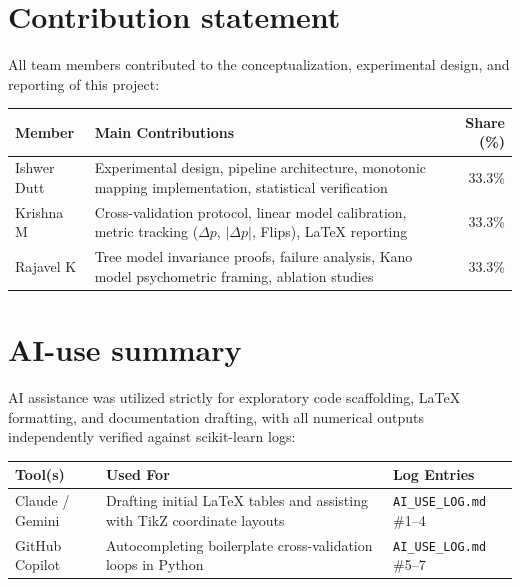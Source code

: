 \documentclass[10pt,a4paper]{article}
\begin{document}
\section*{Contribution statement}
All team members contributed to the conceptualization, experimental design, and reporting of this project:
\begin{center}
\begin{tabularx}{\linewidth}{@{}lXr@{}}
\toprule
\textbf{Member} & \textbf{Main Contributions} & \textbf{Share (\%)} \\
\midrule
Ishwer Dutt & Experimental design, pipeline architecture, monotonic mapping implementation, statistical verification & 33.3\% \\
Krishna M & Cross-validation protocol, linear model calibration, metric tracking ($\Delta p$, $|\Delta p|$, Flips), LaTeX reporting & 33.3\% \\
Rajavel K & Tree model invariance proofs, failure analysis, Kano model psychometric framing, ablation studies & 33.3\% \\
\bottomrule
\end{tabularx}
\end{center}

\section*{AI-use summary}
AI assistance was utilized strictly for exploratory code scaffolding, LaTeX formatting, and documentation drafting, with all numerical outputs independently verified against scikit-learn logs:
\begin{center}
\begin{tabularx}{\linewidth}{@{}lXl@{}}
\toprule
\textbf{Tool(s)} & \textbf{Used For} & \textbf{Log Entries} \\
\midrule
Claude / Gemini & Drafting initial LaTeX tables and assisting with TikZ coordinate layouts & \texttt{AI\_USE\_LOG.md} \#1--4 \\
GitHub Copilot & Autocompleting boilerplate cross-validation loops in Python & \texttt{AI\_USE\_LOG.md} \#5--7 \\
\bottomrule
\end{tabularx}
\end{center}
\end{document}
